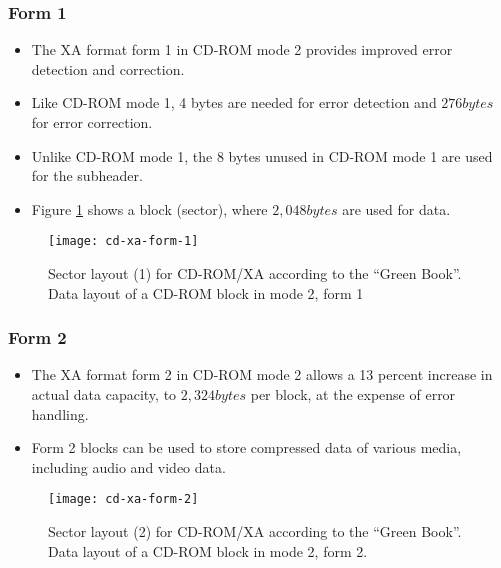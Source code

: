 \subsubsection{Form 1}
\begin{itemize}
	\item The XA format form 1 in CD-ROM mode 2 provides improved error detection and correction. 
	\item Like CD-ROM mode 1, 4 bytes are needed for error detection and $ 276 bytes $ for error correction.
	\item Unlike CD-ROM mode 1, the 8 bytes	unused in CD-ROM mode 1 are used for the subheader. 
	\item Figure \ref{fig:cd-xa-form-1} shows a block (sector), where  $2,048 bytes$ are used for data.
\end{itemize}

\begin{figure}[ht!]
	\centering
	\texttt{[image: cd-xa-form-1]}
	\caption[Sector layout (1) for CD-ROM/XA according to the ``Green Book''.]{Sector layout (1) for CD-ROM/XA according to the ``Green Book''. Data layout of a CD-ROM block in mode 2, form 1}{\label{fig:cd-xa-form-1}}
\end{figure}


\subsubsection{Form 2}

\begin{itemize}
	\item The XA format form 2 in CD-ROM mode 2 allows a 13 percent increase in actual data capacity, to $ 2,324 bytes $ per block, at the expense of error handling.
	\item Form 2 blocks can be used to store compressed data of various media, including audio and video data.
\end{itemize}

\begin{figure}[ht!]
	\centering
	\texttt{[image: cd-xa-form-2]}
	\caption[Sector layout (2) for CD-ROM/XA according to the ``Green Book''.]{Sector layout (2) for CD-ROM/XA according to the ``Green Book''. Data layout of a CD-ROM block in mode 2, form 2.}{\label{fig:cd-xa-form-2}}
\end{figure}


